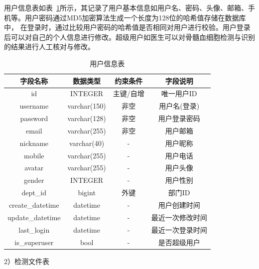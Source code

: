 用户信息表如表~\ref{table:user_table}所示，其记录了用户基本信息如用户名、密码、头像、邮箱、手机等。用户密码通过MD5加密算法生成一个长度为128位的哈希值存储在数据库中，
在登录时，通过比较用户密码的哈希值是否相同对用户进行校验。用户登录后可以对自己的个人信息进行修改。超级用户如医生可以对骨髓血细胞检测与识别的结果进行人工核对与修改。
\begin{table}
    \caption{用户信息表}   
    \centering 
    \label{table:user_table}
    \begin{tabular*}{0.9\hsize}{@{}@{\extracolsep{\fill}}cccc@{}}
      \toprule[1pt]
      字段名称  &  数据类型 & 约束条件 & 字段说明 \\
      \midrule[1pt] 
      id & INTEGER & 主键/自增 & 唯一用户ID   \\ 
      username & varchar(150) & 非空 & 用户名(登录)   \\ 
      password & varchar(128) & 非空 & 用户登录密码   \\ 
      email    & varchar(255) & 非空 & 用户邮箱 \\
      nickname & varchar(40)  &  -   & 用户昵称  \\ 
      mobile   & varchar(255) &  -   & 用户电话  \\
      avatar   & varchar(255) &  -   & 用户头像  \\
      gender   & INTEGER      &  -   & 用户性别   \\
      dept\_id  & bigint       &  外键   &  部门ID  \\ 
      create\_datetime & datetime & -    & 用户创建时间 \\
      update\_datetime & datetime & -    & 最近一次修改时间 \\
      last\_login & datetime & -           & 最近一次登录时间 \\
      is\_superuser & bool   &  -         & 是否超级用户 \\
      \bottomrule[1pt]      
    \end{tabular*} 
  \end{table}
2）检测文件表

